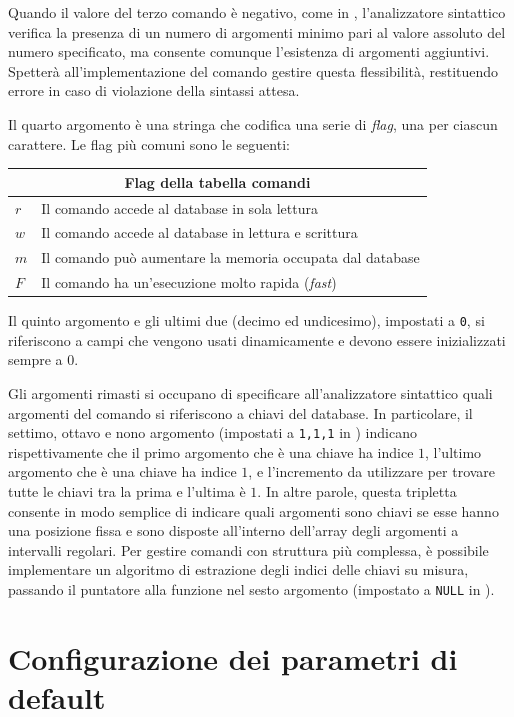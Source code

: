 Quando il valore del terzo comando è negativo, come in , l'analizzatore sintattico verifica
la presenza di un numero di argomenti minimo pari al valore assoluto del numero specificato, ma
consente comunque l'esistenza di argomenti aggiuntivi. Spetterà all'implementazione del comando
gestire questa flessibilità, restituendo errore in caso di violazione della sintassi attesa.

Il quarto argomento è una stringa che codifica una serie di \emph{flag}, una per ciascun carattere.
Le flag più comuni sono le seguenti:

\medskip
\begin{tabular}{ |l|l| }

  \multicolumn{2}{c}{Flag della tabella comandi} \\
  \hline
  $r$ & Il comando accede al database in sola lettura \\
  $w$ & Il comando accede al database in lettura e scrittura \\
  $m$ & Il comando può aumentare la memoria occupata dal database \\
  $F$ & Il comando ha un'esecuzione molto rapida (\emph{fast}) \\
  \hline
\end{tabular}
\medskip

Il quinto argomento e gli ultimi due (decimo ed undicesimo), impostati a \verb|0|, si riferiscono 
a campi che vengono usati dinamicamente e devono essere inizializzati sempre a $0$.

Gli argomenti rimasti si occupano di specificare all'analizzatore sintattico quali argomenti del
comando si riferiscono a chiavi del database. In particolare, il settimo, ottavo e nono argomento
(impostati a \verb|1,1,1| in ) indicano rispettivamente che il primo argomento che è
una chiave ha indice $1$, l'ultimo argomento che è una chiave ha indice $1$, e l'incremento da
utilizzare per trovare tutte le chiavi tra la prima e l'ultima è $1$. In altre parole, questa
tripletta consente in modo semplice di indicare quali argomenti sono chiavi se esse hanno una
posizione fissa e sono disposte all'interno dell'array degli argomenti a intervalli regolari. Per
gestire comandi con struttura più complessa, è possibile implementare un algoritmo di estrazione
degli indici delle chiavi su misura, passando il puntatore alla funzione nel sesto argomento
(impostato a \verb|NULL| in ).


\section{Configurazione dei parametri di default}

